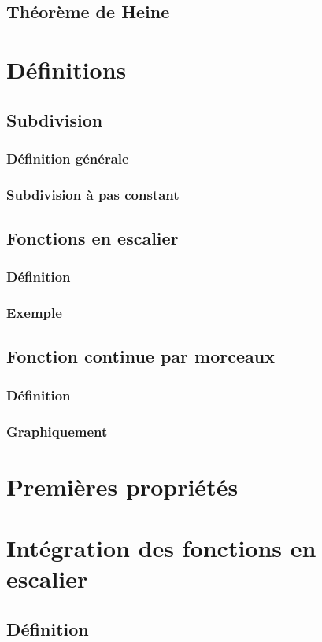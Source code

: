 \documentclass[12pt,a4paper,french]{book}
\begin{document}
		\subsection{Théorème de Heine}
	\section{Définitions}
		\subsection{Subdivision}
			\subsubsection{Définition générale}
			\subsubsection{Subdivision à pas constant}
		\subsection{Fonctions en escalier}
			\subsubsection{Définition}
			\subsubsection{Exemple}
		\subsection{Fonction continue par morceaux}
			\subsubsection{Définition}
			\subsubsection{Graphiquement}
	\section{Premières propriétés}
	\section{Intégration des fonctions en escalier}
		\subsection{Définition}
\end{document}
